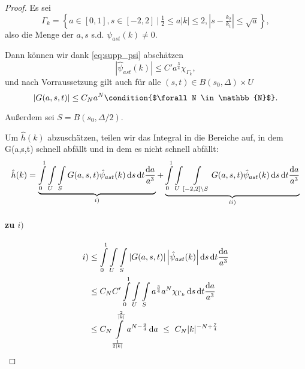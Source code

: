 \begin{proof}
Es sei
\begin{equation*}
    \Gamma_k = \left\{a\in [0,1], s \in [-2,2] ~\Big|~ \tfrac{1}{2} \leq a|k| \leq 2 , \left|s-\tfrac{k_2}{k_1} \right| \leq \sqrt a
                   \right\},
\end{equation*}
also die Menge der $a,s$ s.d. $\psi_{ast}(k) \neq 0$.

Dann können wir dank \cref{eq:supp_psi} abschätzen
\begin{equation*}
    | \hat \psi_{ast} (k)| \leq C' a^{\frac{3}{4}} \chi_{\Gamma_k},
\end{equation*}
und nach Vorraussetzung gilt auch für alle $(s,t) \in B(s_0,\Delta) \times U$
\begin{equation*}
    |G(a,s,t)| \leq C_{N} a^{N}
    \condition{$\forall N \in \mathbb{N}$}.
\end{equation*}

Außerdem sei $S = B(s_0,\Delta/2)$.

Um $\hat h(k)$ abzuschätzen, teilen wir das Integral in die Bereiche auf, in dem G(a,s,t) schnell abfällt und in dem es nicht schnell abfällt:
\begin{dmath*}
    \hat h(k) =
    \underbrace{
    \int \limits_0^1 \int \limits_U \int \limits_{S}
    G(a,s,t) \hat \psi_{ast} (k)
        \d s \d t \frac{\d a}{a^3}}_{i)}
     +
    \underbrace{
     \int \limits_0^1 \int \limits_U \int \limits_{[-2,2]\setminus S}
    G(a,s,t) \hat \psi_{ast} (k)
        \d s \d t \frac{\d a}{a^3}}_{ii)}
\end{dmath*}


\paragraph{zu $i)$}
\begin{align*}
    i) &\leq
     \int \limits_0^1 \int \limits_U \int \limits_{S}
    \left\lvert G(a,s,t)\right\rvert
    \left\lvert \hat \psi_{ast} (k) \right\rvert
        \mathop{}\!\mathrm{d} s \mathop{}\!\mathrm{d} t \frac{\mathop{}\!\mathrm{d} a}{a^3}
    \\ &\leq
    C_N C'
    \int \limits_0^1 \int \limits_U \int \limits_{S}
    a^{\frac{3}{4}} a^N \chi_{\Gamma_k} \mathop{}\!\mathrm{d} s \mathop{}\!\mathrm{d} t \frac{\mathop{}\!\mathrm{d} a}{a^3}
    \\ &\leq
    C_N \int \limits_{\frac{1}{2|k|}}^{\frac{2}{|k|}}
    a^{N-\frac{9}{4}} \mathop{}\!\mathrm{d} a
    ~\leq~
     C_N |k|^{-N+\frac{7}{4}}
\end{align*}




\end{proof}
